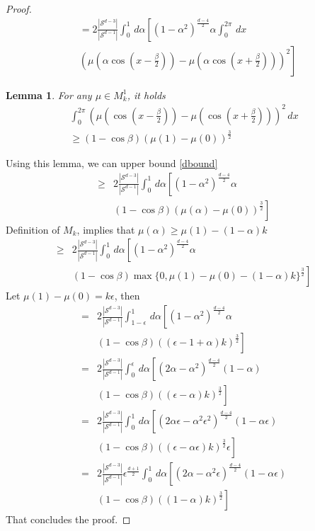 \documentclass[twoside]{article} \usepackage{aistats2017}
\newtheorem{lemma}[theorem]{Lemma}
\begin{document}
\begin{proof}
\begin{align}
        &=2\frac{|\mathcal{S}^{d-3}|}{|\mathcal{S}^{d-1}|}\int_{0}^{1}\,d\alpha\left[(1-\alpha^2)^{\frac{d-4}{2}}\alpha\int_{0}^{2\pi}\, dx\right.\nonumber\\
    &\left.\left(\mu(\alpha\cos(x-\frac{\beta}{2}))-\mu(\alpha \cos(x+\frac{\beta}{2}))\right)^2\right]\label{dbound}
    \end{align}
    \begin{lemma}
        For any $\mu\in M_k^1$, it holds
        \begin{align*}
            \int_{0}^{2\pi}\left(\mu(\cos(x-\frac{\beta}{2}))-\mu( \cos(x+\frac{\beta}{2}))\right)^2\, dx\\
            \geq (1-\cos{\beta})(\mu(1)-\mu(0))^\frac{3}{2}
        \end{align*}
    \end{lemma}
    Using this lemma, we can upper bound \eqref{dbound} 
    \begin{align*}
        \geq&2\frac{|\mathcal{S}^{d-3}|}{|\mathcal{S}^{d-1}|}\int_{0}^{1}\,d\alpha\left[(1-\alpha^2)^{\frac{d-4}{2}}\alpha\right.\\
    &\left.(1-\cos{\beta})(\mu(\alpha)-\mu(0))^\frac{3}{2}\right]
    \end{align*}
    Definition of $M_k$, implies that $\mu(\alpha)\geq \mu(1)-(1-\alpha)k$
    \begin{align*}
        \geq&2\frac{|\mathcal{S}^{d-3}|}{|\mathcal{S}^{d-1}|}\int_{0}^{1}\,d\alpha\left[(1-\alpha^2)^{\frac{d-4}{2}}\alpha\right.\\
    &\left.(1-\cos{\beta})\max\{0,\mu(1)-\mu(0)-(1-\alpha)k\}^\frac{3}{2}\right]
    \end{align*}
Let $\mu(1)-\mu(0) =k\epsilon$, then
    \begin{align*}
        =&2\frac{|\mathcal{S}^{d-3}|}{|\mathcal{S}^{d-1}|}\int_{1-\epsilon}^{1}\,d\alpha\left[(1-\alpha^2)^{\frac{d-4}{2}}\alpha\right.\\
    &\left.(1-\cos{\beta})((\epsilon-1+\alpha)k)^\frac{3}{2}\right]\\
        =&2\frac{|\mathcal{S}^{d-3}|}{|\mathcal{S}^{d-1}|}\int_{0}^{\epsilon}\,d\alpha\left[(2\alpha-\alpha^2)^{\frac{d-4}{2}}(1-\alpha)\right.\\
    &\left.(1-\cos{\beta})((\epsilon-\alpha)k)^\frac{3}{2}\right]\\
    =&2\frac{|\mathcal{S}^{d-3}|}{|\mathcal{S}^{d-1}|}\int_{0}^{1}\,d\alpha\left[(2\alpha\epsilon-\alpha^2\epsilon^2)^{\frac{d-4}{2}}(1-\alpha\epsilon)\right.\\
    &\left.(1-\cos{\beta})((\epsilon-\alpha\epsilon)k)^\frac{3}{2}\epsilon\right]\\
    =&2\frac{|\mathcal{S}^{d-3}|}{|\mathcal{S}^{d-1}|}\epsilon^{\frac{d+1}{2}}\int_{0}^{1}\,d\alpha\left[(2\alpha-\alpha^2\epsilon)^{\frac{d-4}{2}}(1-\alpha\epsilon)\right.\\
    &\left.(1-\cos{\beta})((1-\alpha)k)^\frac{3}{2}\right]
    \end{align*}
    That concludes the proof.
\end{proof}
\end{document}
